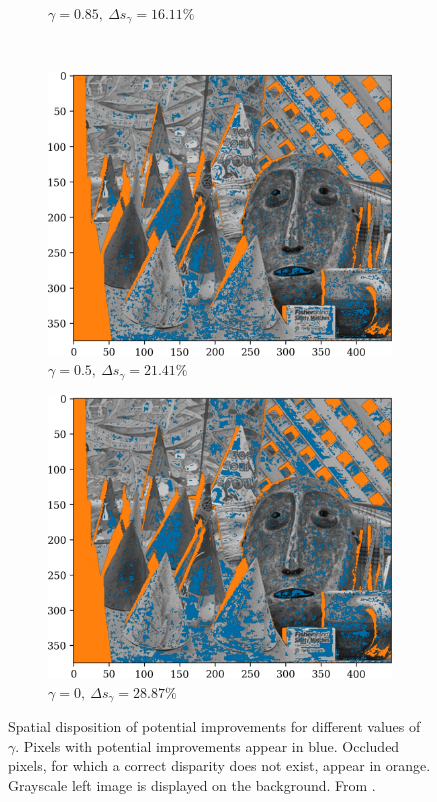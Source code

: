 \begin{figure}[ht]
\begin{subfigure}[t]{0.48\linewidth}
        \caption{$\gamma=0.85,~\Delta s_\gamma=16.11\%$}
        \label{fig:improvements_b}
    \end{subfigure}\\
    \begin{subfigure}[t]{0.48\linewidth}
        \centering
        \includegraphics[width=\linewidth]{Images/Chap_4/Improvements_Pl=0.5.png}
        \caption{$\gamma=0.5,~\Delta s_\gamma=21.41\%$}
        \label{fig:improvements_c}
    \end{subfigure}
    \begin{subfigure}[t]{0.48\linewidth}
        \centering
        \includegraphics[width=\linewidth]{Images/Chap_4/Improvements_Pl=0.0.png}
        \caption{$\gamma=0,~\Delta s_\gamma=28.87\%$}
        \label{fig:improvements_d}
    \end{subfigure}
    \caption{Spatial disposition of potential improvements for different values of $\gamma$. Pixels with potential improvements appear in blue. Occluded pixels, for which a correct disparity does not exist, appear in orange. Grayscale left image is displayed on the background. From \cite{malinowski_uncertainty_2024}.}
    \label{fig:improvements}
\end{figure}

